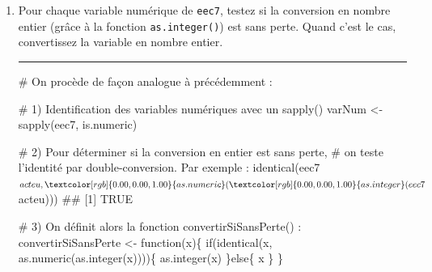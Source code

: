 \documentclass[12pt,twosided, notitlepage]{book}
\newenvironment{Shaded}{}{}
\newcommand{\KeywordTok}[1]{\textcolor[rgb]{0.00,0.00,1.00}{#1}}
\newcommand{\StringTok}[1]{\textcolor[rgb]{0.00,0.50,0.50}{#1}}
\newcommand{\CommentTok}[1]{\textcolor[rgb]{0.00,0.50,0.00}{#1}}
\newcommand{\ControlFlowTok}[1]{\textcolor[rgb]{0.00,0.00,1.00}{#1}}
\newcommand{\OperatorTok}[1]{#1}
\newcommand{\NormalTok}[1]{#1}
\newif \ifsol
\renewenvironment{Shaded}{\begin{snugshade}}{\end{snugshade}}
\begin{document}
\begin{enumerate}
\begin{enumerate}
    \begin{center} \rule{0.5\linewidth}{\linethickness}\end{center}

    \bigskip  \fi 
  \item
    Pour chaque variable numérique de \texttt{eec7}, testez si la
    conversion en nombre entier (grâce à la fonction
    \texttt{as.integer()}) est sans perte. Quand c'est le cas,
    convertissez la variable en nombre
    entier.

    \ifsol 

    \begin{center} \rule{0.5\linewidth}{\linethickness}\end{center}

\begin{Shaded}
\begin{Highlighting}[]
\CommentTok{# On procède de façon analogue à précédemment : }

\CommentTok{# 1) Identification des variables numériques avec un sapply()}
\NormalTok{varNum <-}\StringTok{ }\KeywordTok{sapply}\NormalTok{(eec7, is.numeric)}

\CommentTok{# 2) Pour déterminer si la conversion en entier est sans perte, }
\CommentTok{# on teste l'identité par double-conversion. Par exemple : }
\KeywordTok{identical}\NormalTok{(eec7}\OperatorTok{$}\NormalTok{acteu, }\KeywordTok{as.numeric}\NormalTok{(}\KeywordTok{as.integer}\NormalTok{(eec7}\OperatorTok{$}\NormalTok{acteu)))}
\NormalTok{  ## [1] TRUE}

\CommentTok{# 3) On définit alors la fonction convertirSiSansPerte() : }
\NormalTok{convertirSiSansPerte <-}\StringTok{ }\ControlFlowTok{function}\NormalTok{(x)\{}
  \ControlFlowTok{if}\NormalTok{(}\KeywordTok{identical}\NormalTok{(x, }\KeywordTok{as.numeric}\NormalTok{(}\KeywordTok{as.integer}\NormalTok{(x))))\{}
    \KeywordTok{as.integer}\NormalTok{(x)}
\NormalTok{  \}}\ControlFlowTok{else}\NormalTok{\{}
\NormalTok{    x}
\NormalTok{  \}}
\NormalTok{\}}


\end{Highlighting}
\end{Shaded}
\end{enumerate}
\end{enumerate}
\end{document}
